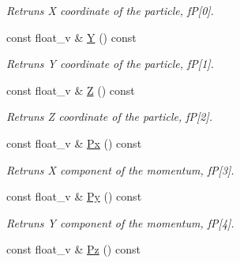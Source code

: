 \begin{DoxyCompactItemize}
\begin{DoxyCompactList}\small\item\em Retruns X coordinate of the particle, fP\mbox{[}0\mbox{]}. \end{DoxyCompactList}\item 
const float\+\_\+v \& \hyperlink{classKFParticleBaseSIMD_a0317637c84246ec7f34accf35c9cb8fd}{Y} () const \hypertarget{classKFParticleBaseSIMD_a0317637c84246ec7f34accf35c9cb8fd}{}\label{classKFParticleBaseSIMD_a0317637c84246ec7f34accf35c9cb8fd}

\begin{DoxyCompactList}\small\item\em Retruns Y coordinate of the particle, fP\mbox{[}1\mbox{]}. \end{DoxyCompactList}\item 
const float\+\_\+v \& \hyperlink{classKFParticleBaseSIMD_a3189c60d84706832532e315723dca770}{Z} () const \hypertarget{classKFParticleBaseSIMD_a3189c60d84706832532e315723dca770}{}\label{classKFParticleBaseSIMD_a3189c60d84706832532e315723dca770}

\begin{DoxyCompactList}\small\item\em Retruns Z coordinate of the particle, fP\mbox{[}2\mbox{]}. \end{DoxyCompactList}\item 
const float\+\_\+v \& \hyperlink{classKFParticleBaseSIMD_a3695da551e4329333ba60889472954bf}{Px} () const \hypertarget{classKFParticleBaseSIMD_a3695da551e4329333ba60889472954bf}{}\label{classKFParticleBaseSIMD_a3695da551e4329333ba60889472954bf}

\begin{DoxyCompactList}\small\item\em Retruns X component of the momentum, fP\mbox{[}3\mbox{]}. \end{DoxyCompactList}\item 
const float\+\_\+v \& \hyperlink{classKFParticleBaseSIMD_a567654c96e90393a47a5e48e95aed117}{Py} () const \hypertarget{classKFParticleBaseSIMD_a567654c96e90393a47a5e48e95aed117}{}\label{classKFParticleBaseSIMD_a567654c96e90393a47a5e48e95aed117}

\begin{DoxyCompactList}\small\item\em Retruns Y component of the momentum, fP\mbox{[}4\mbox{]}. \end{DoxyCompactList}\item 
const float\+\_\+v \& \hyperlink{classKFParticleBaseSIMD_a4ac015d5658f6874d0e769b3d2eb7b9a}{Pz} () const \hypertarget{classKFParticleBaseSIMD_a4ac015d5658f6874d0e769b3d2eb7b9a}{}\label{classKFParticleBaseSIMD_a4ac015d5658f6874d0e769b3d2eb7b9a}


\end{DoxyCompactItemize}
